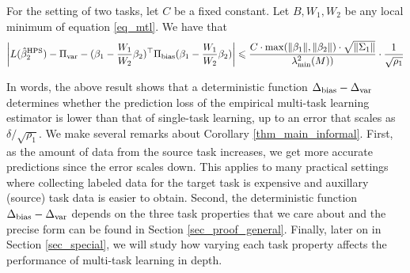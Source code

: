 \begin{corollary}\label{thm_main_informal}
	For the setting of two tasks, let $C$ be a fixed constant.
	Let $B, W_1, W_2$ be any local minimum of equation \eqref{eq_mtl}.
	We have that
	\begin{align*}
		{\left| {L(\hat{\beta}_2^{\textup{HPS}}) - \Pi_{\text{var}} - (\beta_1 - \frac{W_1}{W_2}\beta_2)^{\top}\Pi_{\text{bias}} (\beta_1 - \frac{W_1}{W_2}\beta_2)} \right|} \leqslant \frac{ C\cdot \max(\|\beta_1\|, \|\beta_2\|) \cdot \sqrt{\|\Sigma_1\|} } {\lambda_{\min}^2(M)) } \cdot \frac{1}{\sqrt{\rho_1}}
	\end{align*}
\end{corollary}
In words, the above result shows that a deterministic function $\Delta_{\text{bias}} - \Delta_{\text{var}}$ determines whether the prediction loss of the empirical multi-task learning estimator is lower than that of single-task learning, up to an error that scales as $\delta / \sqrt{\rho_1}$.
We make several remarks about Corollary \ref{thm_main_informal}.
First, as the amount of data from the source task increases, we get more accurate predictions  since the error scales down.
This applies to many practical settings where collecting labeled data for the target task is expensive and auxillary (source) task data is easier to obtain.
Second, the deterministic function $\Delta_{\text{bias}} - \Delta_{\text{var}}$ depends on the three task properties that we care about and the precise form can be found in Section \ref{sec_proof_general}.
Finally, later on in Section \ref{sec_special}, we will study how varying each task property affects the performance of multi-task learning in depth.

